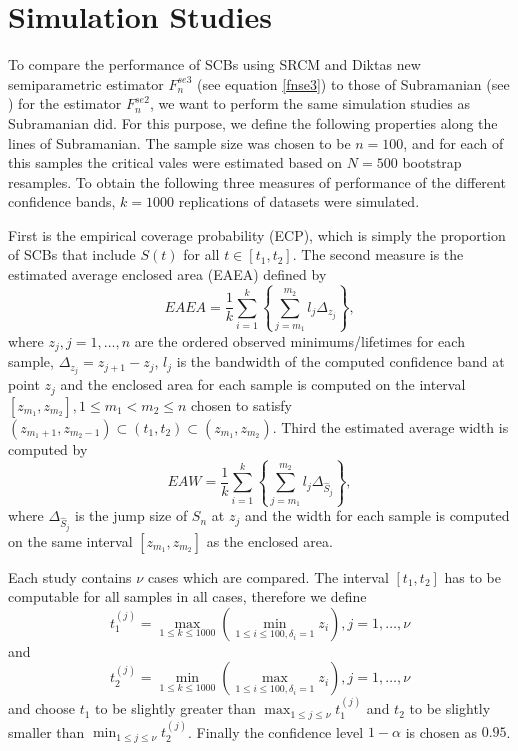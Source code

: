 \chapter{Simulation Studies}

To compare the performance of SCBs using SRCM and Diktas new semiparametric estimator  $F_n^{se3}$ (see equation \ref{fnse3}) to those of Subramanian (see \cite{PAPER5}) for the estimator $F_n^{se2}$, we want to perform the same simulation studies as Subramanian did. For this purpose, we define the following properties along the lines of Subramanian.
The sample size was chosen to be $n=100$, and for each of this samples the critical vales were estimated based on $N=500$ bootstrap resamples. To obtain the following three measures of performance of the different confidence bands, $k=1000$ replications of datasets were simulated.

First is the empirical coverage probability (ECP), which is simply the proportion of SCBs that include $S(t)$ for all $t \in [t_1,t_2]$. 
The second measure is the estimated average enclosed area (EAEA) defined by
\[
EAEA = \frac{1}{k} \sum_{i=1}^k \left\{ \sum_{j=m_1}^{m_2} l_j\Delta_{z_j}\right\},
\]
where $z_j, j=1,\ldots,n$ are the ordered observed minimums/lifetimes for each sample,
$\Delta_{z_j} = z_{j+1}-z_j$, $l_j$ is the bandwidth of the computed confidence band at point $z_j$ 
and the enclosed area for each sample is computed on the interval $[z_{m_1},z_{m_2}], 1 \leq m_1 < m_2 \leq n$ chosen to satisfy $(z_{m_1+1},z_{m_2-1}) \subset (t_1,t_2) \subset (z_{m_1},z_{m_2})$.
Third the estimated average width is computed by
\[
EAW = \frac{1}{k} \sum_{i=1}^k \left\{ \sum_{j=m_1}^{m_2} l_j\Delta_{\hat{S}_j}\right\},
\]
where $\Delta_{\hat{S}_j}$ is the jump size of $S_n$ at $z_j$ and the width for each sample is computed on the same interval $[z_{m_1},z_{m_2}]$ as the enclosed area.

Each study contains $\nu$ cases which are compared. The interval $[t_1,t_2]$ has to be computable for all samples in all cases, therefore we define
\[
t_1^{(j)} = \max_{1\leq k \leq 1000} \left( \min_{1\leq i \leq 100,\delta_i=1} z_i \right), j = 1,\ldots,\nu 
\] 
and
\[
t_2^{(j)} = \min_{1\leq k \leq 1000} \left( \max_{1\leq i \leq 100,\delta_i=1} z_i \right), j = 1,\ldots,\nu 
\]
and choose $t_1$ to be slightly greater than $\max_{1\leq j \leq \nu}t_1^{(j)}$ and $t_2$ to be slightly smaller than  $\min_{1\leq j \leq \nu}t_2^{(j)}$.
Finally the confidence level $1-\alpha$ is chosen as $0.95$.

